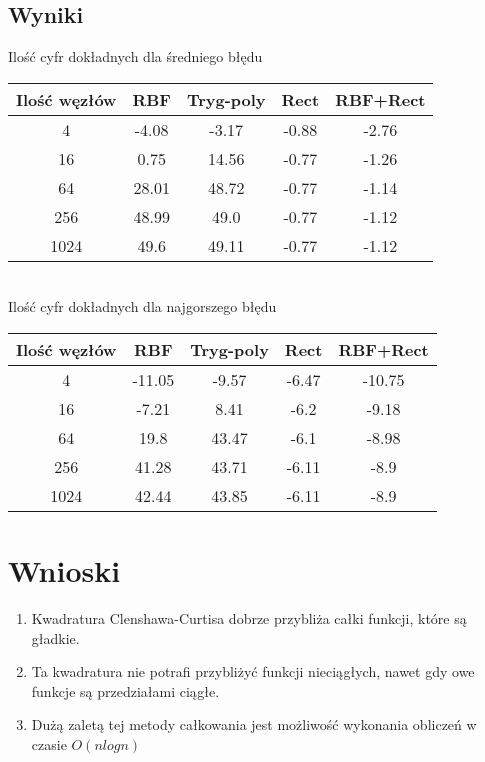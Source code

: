 \documentclass[11pt,wide]{mwart}
\begin{document}
\subsection{Wyniki}
\begin{center}
Ilość cyfr dokładnych dla średniego błędu\\
\begin{tabular}{ |c||c|c|c|c| } 
    \hline
    Ilość węzłów & RBF & Tryg-poly & Rect & RBF+Rect \\ 
    \hline
    \hline
    4 & -4.08 & -3.17 & -0.88 & -2.76 \\
    \hline
    16 & 0.75 & 14.56 & -0.77 & -1.26 \\
    \hline
    64 & 28.01 & 48.72 & -0.77 & -1.14 \\
    \hline
    256 & 48.99 & 49.0 & -0.77 & -1.12 \\
    \hline
    1024 & 49.6 & 49.11 & -0.77 & -1.12 \\
    \hline
\end{tabular}\\
Ilość cyfr dokładnych dla najgorszego błędu\\
\begin{tabular}{ |c||c|c|c|c| } 
\hline
Ilość węzłów & RBF & Tryg-poly & Rect & RBF+Rect \\ 
\hline
\hline

4 & -11.05 & -9.57 & -6.47 & -10.75 \\
\hline
16 & -7.21 & 8.41 & -6.2 & -9.18 \\
\hline
64 & 19.8 & 43.47 & -6.1 & -8.98 \\
\hline
256 & 41.28 & 43.71 & -6.11 & -8.9 \\
\hline
1024 & 42.44 & 43.85 & -6.11 & -8.9 \\
\hline
\end{tabular} 

\end{center}

\section{Wnioski}
\begin{enumerate}
\item Kwadratura Clenshawa-Curtisa dobrze przybliża całki funkcji, które są gładkie.
\item Ta kwadratura nie potrafi przybliżyć funkcji nieciągłych, nawet
gdy owe funkcje są przedziałami ciągłe.
\item Dużą zaletą tej metody całkowania jest możliwość wykonania obliczeń w czasie $O(n log n)$

\end{enumerate}
\end{document}
